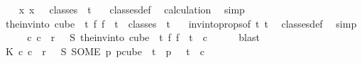 \begin{isabellebody}
\ \isamarkupfalse%
\ {\isacharasterisk}{\kern0pt}{\isacharasterisk}{\kern0pt}{\isacharcolon}{\kern0pt}\ {\isachardoublequoteopen}{\isasymexists}{\isacharbang}{\kern0pt}x{\isachardot}{\kern0pt}\ x\ \ {\isasymin}\ classes\ {}\ t\ {}{\isachardoublequoteclose}\ \isamarkupfalse%
\ classes{\isacharunderscore}{\kern0pt}def\ \isamarkupfalse%
\ calculation{\isacharparenleft}{\kern0pt}{}{\isacharparenright}{\kern0pt}\ \isamarkupfalse%
\ simp\isanewline
\ \ \isamarkupfalse%
\ \isamarkupfalse%
\ {\isachardoublequoteopen}the{\isacharunderscore}{\kern0pt}inv{\isacharunderscore}{\kern0pt}into\ {\isacharparenleft}{\kern0pt}cube\ {}\ {\isacharparenleft}{\kern0pt}t{\isacharplus}{\kern0pt}{}{\isacharparenright}{\kern0pt}{\isacharparenright}{\kern0pt}\ {\isacharparenleft}{\kern0pt}{\isasymlambda}f{\isachardot}{\kern0pt}\ f\ {}{\isacharparenright}{\kern0pt}\ t\ {\isasymin}\ classes\ {}\ t\ {}{\isachardoublequoteclose}\ \isamarkupfalse%
\ invintoprops{\isacharbrackleft}{\kern0pt}of\ t\ {\isachardoublequoteopen}t{\isacharplus}{\kern0pt}{}{\isachardoublequoteclose}{\isacharbrackright}{\kern0pt}\ \isamarkupfalse%
\ classes{\isacharunderscore}{\kern0pt}def\ \isamarkupfalse%
\ simp\isanewline
\isanewline
\ \ \isamarkupfalse%
\ \isamarkupfalse%
\ {\isachardoublequoteopen}{\isasymexists}c{}{\isachardot}{\kern0pt}\ c{}\ {\isacharless}{\kern0pt}\ r\ {\isasymand}\ {\isasymchi}\ {\isacharparenleft}{\kern0pt}S\ {\isacharparenleft}{\kern0pt}the{\isacharunderscore}{\kern0pt}inv{\isacharunderscore}{\kern0pt}into\ {\isacharparenleft}{\kern0pt}cube\ {}\ {\isacharparenleft}{\kern0pt}t{\isacharplus}{\kern0pt}{}{\isacharparenright}{\kern0pt}{\isacharparenright}{\kern0pt}\ {\isacharparenleft}{\kern0pt}{\isasymlambda}f{\isachardot}{\kern0pt}\ f\ {}{\isacharparenright}{\kern0pt}\ t{\isacharparenright}{\kern0pt}{\isacharparenright}{\kern0pt}\ {\isacharequal}{\kern0pt}\ c{}{\isachardoublequoteclose}\ \isamarkupfalse%
\ {\isacharasterisk}{\kern0pt}\ {\isacharasterisk}{\kern0pt}{\isacharasterisk}{\kern0pt}\ \isamarkupfalse%
\ blast\isanewline
\ \ \isamarkupfalse%
\ \isamarkupfalse%
\ K{}{\isacharcolon}{\kern0pt}\ {\isachardoublequoteopen}{\isasymexists}c{}{\isachardot}{\kern0pt}\ c{}\ {\isacharless}{\kern0pt}\ r\ {\isasymand}\ {\isasymchi}\ {\isacharparenleft}{\kern0pt}S\ {\isacharparenleft}{\kern0pt}SOME\ p{\isachardot}{\kern0pt}\ p{\isasymin}cube\ {}\ {\isacharparenleft}{\kern0pt}t{\isacharplus}{\kern0pt}{}{\isacharparenright}{\kern0pt}\ {\isasymand}\ p\ {}\ {\isacharequal}{\kern0pt}\ t{\isacharparenright}{\kern0pt}{\isacharparenright}{\kern0pt}\ {\isacharequal}{\kern0pt}\ c{}{\isachardoublequoteclose}\ \isamarkupfalse%

\end{isabellebody}
